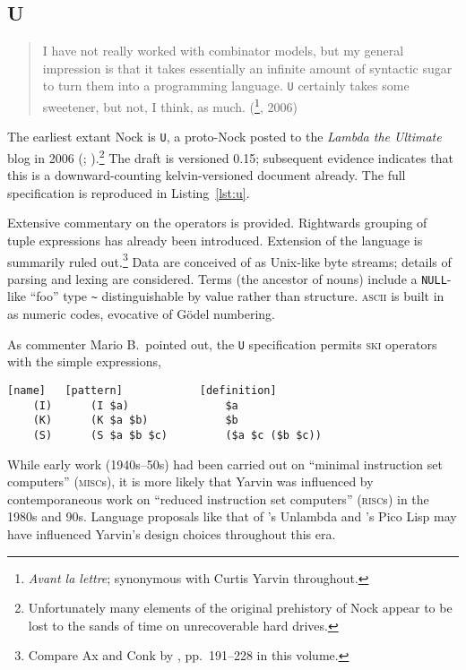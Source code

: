 \documentclass[twoside]{article}
\begin{document}
\subsection[\texttt{U}]{U}

\begin{quote}
I have not really worked with combinator models, but my general impression is that it takes essentially an infinite amount of syntactic sugar to turn them into a programming language. \texttt{U} certainly takes some sweetener, but not, I think, as much.  (\footnote{\emph{Avant la lettre}; synonymous with Curtis Yarvin throughout.}, 2006)
\end{quote}

\sloppy
The earliest extant Nock is \texttt{U}, a proto-Nock posted to the \textit{Lambda the Ultimate} blog in 2006 (\citet{Yarvin2006a}; \citet{Yarvin2006}).\footnote{Unfortunately many elements of the original prehistory of Nock appear to be lost to the sands of time on unrecoverable hard drives.}  The draft is versioned 0.15; subsequent evidence indicates that this is a downward-counting kelvin-versioned document already.  The full specification is reproduced in Listing~\ref{lst:u}.

Extensive commentary on the operators is provided.  Rightwards grouping of tuple expressions has already been introduced.  Extension of the language is summarily ruled out.\footnote{Compare Ax and Conk by , pp.~191–228 in this volume.}  Data are conceived of as Unix-like byte streams; details of parsing and lexing are considered.  Terms (the ancestor of nouns) include a \texttt{NULL}-like ``foo'' type \texttt{\textasciitilde} distinguishable by value rather than structure.  \textsc{ascii} is built in as numeric codes, evocative of G\"{o}del numbering.

As commenter Mario B.\ pointed out, the \texttt{U} specification permits \textsc{ski} operators with the simple expressions,

\begin{lstlisting}[style=listingblock]
   [name]   [pattern]            [definition]
    (I)      (I $a)               $a
    (K)      (K $a $b)            $b
    (S)      (S $a $b $c)         ($a $c ($b $c))
\end{lstlisting}

While early work (1940s--50s) had been carried out on ``minimal instruction set computers'' (\textsc{misc}s), it is more likely that Yarvin was influenced by contemporaneous work on ``reduced instruction set computers'' (\textsc{risc}s) in the 1980s and 90s.  Language proposals like that of \citeauthor{Madore2003}'s Unlambda and \citeauthor{Burger2006}'s Pico Lisp may have influenced Yarvin's design choices throughout this era.
\end{document}

